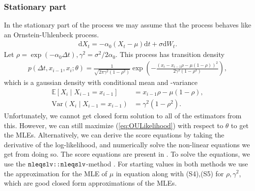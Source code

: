\subsubsection{Stationary part}\label{subsubsec:OUprocessStationary}
In the stationary part of the process we may assume that the process behaves like an Ornstein-Uhlenbeck process. 
\begin{align}
    \mathrm{d}X_t = -\alpha_0\left(X_t-\mu\right) \mathrm{d}t + \sigma \mathrm{d}W_t.
\end{align}
Let $\rho = \exp\left(-\alpha_0\Delta t\right), \gamma^2 = \sigma^2/2\alpha_0$. This process has transition density \cite[equation (S3)]{DitlevsenSupplementary}
\begin{align}
    p\left(\Delta t, x_{i-1}, x_i;\theta\right) = \frac{1}{\sqrt{2\pi\gamma^2\left(1-\rho^2\right)}}\exp\left(-\frac{\left(x_i-x_{i-1}\rho - \mu\left(1-\rho\right)\right)^2}{2\gamma^2\left(1-\rho^2\right)}\right), \label{eq:OULikelihood}
\end{align}
which is a gaussian density with conditional mean and -variance
\begin{align}
    \mathbb{E}\left[X_i\middle|X_{i-1} = x_{i-1}\right] &= x_{i - 1}\rho - \mu\left(1-\rho\right),\\
    \mathrm{Var}\left(X_i\middle|X_{i-1} = x_{i-1}\right) &= \gamma^2\left(1-\rho^2\right).
\end{align}
Unfortunately, we cannot get closed form solution to all of the estimators from this. However, we can still maximize (\ref{eq:OULikelihood}) with respect to $\theta$ to get the MLEs. Alternatively, we can derive the score equations by taking the derivative of the log-likelihood, and numerically solve the non-linear equations we get from doing so. The score equations are present in \cite[p.1, bottom]{DitlevsenSupplementary}. To solve the equations, we use the $\texttt{nleqslv::nleqslv}$-method \cite{nleqslv}. For starting values in both methods we use the approximation for the MLE of $\mu$ in equation \cite[(S4)]{DitlevsenSupplementary} along with (S4),(S5) for $\rho, \gamma^2$, which are good closed form approximations of the MLEs.
